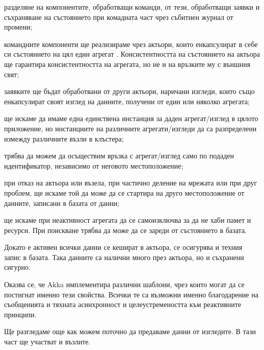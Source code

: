 \begin{itemize*}
  \item разделяне на компонентите, обработващи команди, от тези, обработващи заявки и съхраняване на състоянието при комадната част чрез събитиен журнал от промени;
  
  \item командните компоненти ще реализираме чрез актьори, които енкапсулират в себе си състоянието на цял един агрегат \cite{evans2003DDD}. Консистентността на състоянието на актьора ще гарантира консистентността на агрегата, но не и на връзките му с външния свят;
  
  \item заявките ще бъдат обработвани от други актьори, наричани изгледи, които също енкапсулират своят изглед на данните, получени от един или няколко агрегата;
  
  \item ще искаме да имаме една единствена инстанция за даден агрегат/изглед в цялото приложение, но инстанциите на различните агрегати/изгледи да са разпределени измежду различните възли в клъстера;
  
  \item трябва да можем да осъществим връзка с агрегат/изглед само по подаден идентификатор, независимо от неговото местоположение;
  
  \item при отказ на актьора или възела, при частично деление на мрежата или при друг проблем, ще искаме той да може да се стартира на друго местоположение от данните, записани в базата от данни;
  
  \item ще искаме при неактивност агрегата да се самоизключва за да не хаби памет и ресурси. При поискване трябва да може да се зареди от състоянието в базата.
  
  \item Докато е активен всички данни се кешират в актьора, се осигурява и техния запис в базата. Така данните са налични много през актьора, но и съхранени сигурно.
\end{itemize*}

Оказва се, че Akka имплементира различни шаблони, чрез които могат да се постигнат именно тези свойства. Всички те са възможни именно благодарение на съобщенията и тяхната асинхронност и целеустремеността към реактивните принципи.

Ще разгледаме още как можем поточно да предаваме данни от изгледите. В тази част ще участват  и  възлите.

